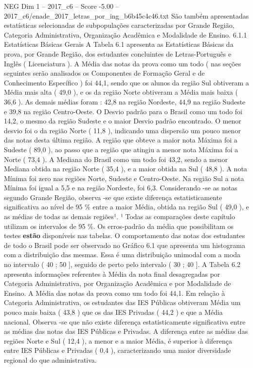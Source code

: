 \begin{textsample}{NEG Dim 1 – 2017\_c6 – Score -5.00 – 2017\_c6/enade\_2017\_letras\_por\_ing\_b6b45c4c46.txt}
São também apresentadas estatísticas selecionadas de subpopulações caracterizadas por Grande Região, Categoria Administrativa, Organização Acadêmica e Modalidade de Ensino. 6.1.1 Estatísticas Básicas Gerais A Tabela 6.1 apresenta as Estatísticas Básicas da prova, por Grande Região, dos estudantes concluintes de Letras-Português e Inglês ( Licenciatura ).
A Média das notas da prova como um todo ( nas seções seguintes serão analisados os Componentes de Formação Geral e de Conhecimento Específico ) foi 44,1, sendo que os alunos da região Sul obtiveram a Média mais alta ( 49,0 ), e os da região Norte obtiveram a Média mais baixa ( 36,6 ).
As demais médias foram : 42,8 na região Nordeste, 44,9 na região Sudeste e 39,8 na região Centro-Oeste.
O Desvio padrão para o Brasil como um todo foi 14,2, o mesmo da região Sudeste e o maior Desvio padrão encontrado.
O menor desvio foi o da região Norte ( 11,8 ), indicando uma dispersão um pouco menor das notas desta última região.
A região que obteve a maior nota Máxima foi a Sudeste ( 89,0 ), ao passo que a região que atingiu a menor nota Máxima foi a Norte ( 73,4 ).
A Mediana do Brasil como um todo foi 43,2, sendo a menor Mediana obtida na região Norte ( 35,4 ), e a maior obtida na Sul ( 48,8 ).
A nota Mínima foi zero nas regiões Norte, Sudeste e Centro-Oeste.
Na região Sul a nota Mínima foi igual a 5,5 e na região Nordeste, foi 6,3.
Considerando -se as notas segundo Grande Região, observa -se que existe diferença estatisticamente significativa ao nível de 95 \% entre a maior Média, obtida na região Sul ( 49,0 ), e as médias de todas as demais regiões¹. ¹ Todas as comparações deste capítulo utilizam os intervalos de 95 \%.
Os erros-padrão da média que possibilitam os testes \textbf{estão} disponíveis nas tabelas.
O comportamento das notas dos estudantes de todo o Brasil pode ser observado no Gráfico 6.1 que apresenta um histograma com a distribuição das mesmas.
Essa é uma distribuição unimodal com a moda no intervalo ( 40 ; 50 ], seguido de perto pelo intervalo ( 30 ; 40 ].
A Tabela 6.2 apresenta informações referentes à Média da nota final desagregadas por Categoria Administrativa, por Organização Acadêmica e por Modalidade de Ensino.
A Média das notas da prova como um todo foi 44,1.
Em relação à Categoria Administrativa, os estudantes das IES Públicas obtiveram Média um pouco mais baixa ( 43,8 ) que os das IES Privadas ( 44,2 ) e que a Média nacional.
Observa -se que não existe diferença estatisticamente significativa entre as médias das notas das IES Públicas e Privadas.
A diferença entre as médias das regiões Norte e Sul ( 12,4 ), a menor e a maior Média, é superior à diferença entre IES Públicas e Privadas ( 0,4 ), caracterizando uma maior diversidade regional do que administrativa.

\end{textsample}
